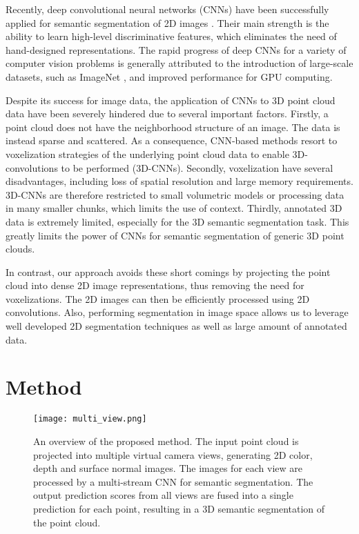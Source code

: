 \documentclass[runningheads,a4paper]{llncs}
\begin{document}
Recently, deep convolutional neural networks (CNNs) have been successfully applied for semantic segmentation of 2D images \cite{long2015fully}. Their main strength is the ability to learn high-level discriminative features, which eliminates the need of hand-designed representations. The rapid progress of deep CNNs for a variety of computer vision problems is generally attributed to the introduction of large-scale datasets, such as ImageNet \cite{imagenet_cvpr09}, and improved performance for GPU computing.

Despite its success for image data, the application of CNNs to 3D point cloud data \cite{HuangICPR16,QiCVPR16,WuCVPR15} have been severely hindered due to several important factors. Firstly, a point cloud does not have the neighborhood structure of an image. The data is instead sparse and scattered. As a consequence, CNN-based methods resort to voxelization strategies of the underlying point cloud data to enable 3D-convolutions to be performed (3D-CNNs). Secondly, voxelization have several disadvantages, including loss of spatial resolution and large memory requirements. 3D-CNNs are therefore restricted to small volumetric models or processing data in many smaller chunks, which limits the use of context. Thirdly, annotated 3D data is extremely limited, especially for the 3D semantic segmentation task. This greatly limits the power of CNNs for semantic segmentation of generic 3D point clouds. 

In contrast, our approach avoids these short comings by projecting the point cloud into dense 2D image representations, thus removing the need for voxelizations. The 2D images can then be efficiently processed using 2D convolutions. Also, performing segmentation in image space allows us to leverage well developed 2D segmentation techniques as well as large amount of annotated data.

\section{Method}


\begin{figure}[!t]
\begin{center}
  \texttt{[image: multi\_view.png]}
  \end{center}
  \caption{An overview of the proposed method. The input point cloud is projected into multiple virtual camera views, generating 2D color, depth and surface normal images. The images for each view are processed by a multi-stream CNN for semantic segmentation. The output prediction scores from all views are fused into a single prediction for each point, resulting in a 3D semantic segmentation of the point cloud.}
  \label{fig:overview}
\end{figure}
\end{document}
